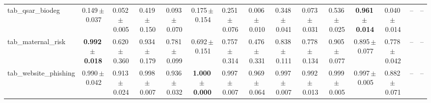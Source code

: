 \documentclass[8pt]{extarticle}
\begin{document}
\begin{longtable}{l*{14}{c}}
tab\_qsar\_biodeg & 0.149\,$\pm$\,0.037 & 0.052\,$\pm$\,0.005 & 0.419\,$\pm$\,0.150 & 0.093\,$\pm$\,0.070 & 0.175\,$\pm$\,0.154 & 0.251\,$\pm$\,0.076 & 0.006\,$\pm$\,0.010 & 0.348\,$\pm$\,0.041 & 0.073\,$\pm$\,0.031 & 0.536\,$\pm$\,0.025 & \textbf{0.961\,$\pm$\,0.014} & 0.040\,$\pm$\,0.014 & -- & -- \\
tab\_maternal\_risk & \textbf{0.992\,$\pm$\,0.018} & 0.620\,$\pm$\,0.360 & 0.934\,$\pm$\,0.179 & 0.781\,$\pm$\,0.099 & 0.692\,$\pm$\,0.151 & 0.757\,$\pm$\,0.314 & 0.476\,$\pm$\,0.331 & 0.838\,$\pm$\,0.111 & 0.778\,$\pm$\,0.134 & 0.905\,$\pm$\,0.077 & 0.895\,$\pm$\,0.077 & 0.778\,$\pm$\,0.042 & -- & -- \\
tab\_website\_phishing & 0.990\,$\pm$\,0.042 & 0.913\,$\pm$\,0.024 & 0.998\,$\pm$\,0.007 & 0.936\,$\pm$\,0.032 & \textbf{1.000\,$\pm$\,0.000} & 0.997\,$\pm$\,0.007 & 0.969\,$\pm$\,0.064 & 0.997\,$\pm$\,0.007 & 0.992\,$\pm$\,0.013 & 0.999\,$\pm$\,0.005 & 0.997\,$\pm$\,0.005 & 0.882\,$\pm$\,0.071 & -- & -- \\
\end{longtable}
\end{document}
